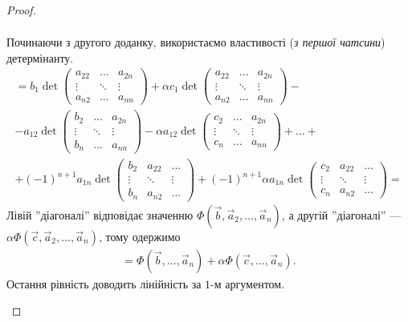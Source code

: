 \documentclass{math_library}
\begin{document}
\begin{proof}
\begin{enumerate}[wide=0pt,label={\Roman*.}]
\begin{multline*}
\end{multline*}
Починаючи з другого доданку, використаємо властивості (\textit{з першої чатсини}) детермінанту.
\begin{multline*}
\boxed{=}  b_1 \det \begin{pmatrix} a_{22} & \dots & a_{2n} \\ \vdots & \ddots & \vdots \\ a_{n2} & \dots & a_{nn} \end{pmatrix} + \alpha c_1 \det \begin{pmatrix} a_{22} & \dots & a_{2n} \\ \vdots & \ddots & \vdots \\ a_{n2} & \dots & a_{nn} \end{pmatrix} - \\
- a_{12} \det \begin{pmatrix} b_2 & \dots & a_{2n} \\ \vdots & \ddots & \vdots \\ b_n & \dots & a_{nn} \end{pmatrix} - \alpha a_{12} \det \begin{pmatrix} c_2 & \dots & a_{2n} \\ \vdots & \ddots & \vdots \\ c_n & \dots & a_{nn} \end{pmatrix} + \dots + \\
+ (-1)^{n+1} a_{1n} \det \begin{pmatrix} b_2 & a_{22} & \dots \\ \vdots & \ddots & \vdots \\ b_n & a_{n2} & \dots \end{pmatrix} + (-1)^{n+1} \alpha a_{1n} \det \begin{pmatrix} c_2 & a_{22} & \dots \\ \vdots & \ddots & \vdots \\ c_n & a_{n2} & \dots \end{pmatrix} \boxed{=}
\end{multline*}
Лівій ''діагоналі'' відповідає значенню $\Phi(\vec{b},\vec{a}_2,\dots,\vec{a}_n)$, а другій ''діагоналі'' --- $\alpha \Phi(\vec{c},\vec{a}_2,\dots,\vec{a}_n)$, тому одержимо
\begin{align*}
\boxed{=} \Phi(\vec{b}, \dots, \vec{a}_n) + \alpha \Phi(\vec{c},\dots, \vec{a}_n).
\end{align*}
Остання рівність доводить лінійність за $1$-м аргументом.


\end{enumerate}
\end{proof}
\end{document}
